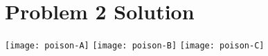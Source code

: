 \section*{Problem 2 Solution}

\texttt{[image: poison-A]}
\texttt{[image: poison-B]}
\texttt{[image: poison-C]}

